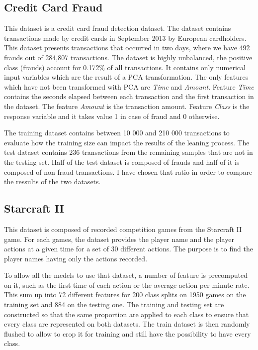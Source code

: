 \documentclass[10pt]{article}
\begin{document}
		\subsection*{Credit Card Fraud}
			This dataset is a credit card fraud detection dataset. The dataset contains transactions made by credit cards in September 2013 by European cardholders. This dataset presents transactions that occurred in two days, where we have 492 frauds out of 284,807 transactions. The dataset is highly unbalanced, the positive class (frauds) account for 0.172\% of all transactions. It contains only numerical input variables which are the result of a PCA transformation. The only features which have not been transformed with PCA are \textit{Time} and \textit{Amount}. Feature \textit{Time} contains the seconds elapsed between each transaction and the first transaction in the dataset. The feature \textit{Amount} is the transaction amount. Feature \textit{Class} is the response variable and it takes value 1 in case of fraud and 0 otherwise.

			The training dataset contains between 10 000 and 210 000 transactions to evaluate how the training size can impact the results of the leaning process. The test dataset contains 236 transactions from the remaining samples that are not in the testing set. Half of the test dataset is composed of frauds and half of it is composed of non-fraud transactions. I have chosen that ratio in order to compare the ressults of the two datasets.
		\subsection*{Starcraft II}
			This dataset is composed of recorded competition games from the Starcraft II game. For each games, the dataset provides the player name and the player actions at a given time for a set of 30 different actions. The purpose is to find the player names having only the actions recorded.

			To allow all the medels to use that dataset, a number of feature is precomputed on it, such as the first time of each action or the average action per minute rate. This sum up into 72 different features for 200 class splits on 1950 games on the training set and 884 on the testing one. The training and testing set are constructed so that the same proportion are applied to each class to ensure that every class are represented on both datasets. The train dataset is then randomly flushed to allow to crop it for training and still have the possibility to have every class.
\end{document}
